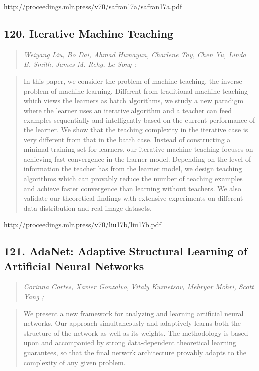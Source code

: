 \documentclass{article}
\begin{document}
\href{http://proceedings.mlr.press/v70/safran17a/safran17a.pdf}{http://proceedings.mlr.press/v70/safran17a/safran17a.pdf}

\subsection{120. Iterative Machine Teaching}

\begin{quote}
\footnotesize{\textit{Weiyang Liu, Bo Dai, Ahmad Humayun, Charlene Tay, Chen Yu, Linda B. Smith, James M. Rehg, Le Song ;}}
\end{quote}

\begin{quote}
    In this paper, we consider the problem of machine teaching, the inverse problem of machine learning. Different from traditional machine teaching which views the learners as batch algorithms, we study a new paradigm where the learner uses an iterative algorithm and a teacher can feed examples sequentially and intelligently based on the current performance of the learner. We show that the teaching complexity in the iterative case is very different from that in the batch case. Instead of constructing a minimal training set for learners, our iterative machine teaching focuses on achieving fast convergence in the learner model. Depending on the level of information the teacher has from the learner model, we design teaching algorithms which can provably reduce the number of teaching examples and achieve faster convergence than learning without teachers. We also validate our theoretical findings with extensive experiments on different data distribution and real image datasets.  \end{quote}

\href{http://proceedings.mlr.press/v70/liu17b/liu17b.pdf}{http://proceedings.mlr.press/v70/liu17b/liu17b.pdf}

\subsection{121. AdaNet: Adaptive Structural Learning of Artificial Neural Networks}

\begin{quote}
\footnotesize{\textit{Corinna Cortes, Xavier Gonzalvo, Vitaly Kuznetsov, Mehryar Mohri, Scott Yang ;}}
\end{quote}

\begin{quote}
    We present a new framework for analyzing and learning artificial neural networks. Our approach simultaneously and adaptively learns both the structure of the network as well as its weights. The methodology is based upon and accompanied by strong data-dependent theoretical learning guarantees, so that the final network architecture provably adapts to the complexity of any given problem.  \end{quote}
\end{document}
